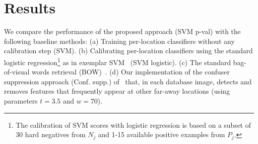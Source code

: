 





   \section{Results}
      We compare the performance of the proposed approach (SVM p-val) with the following baseline methods: (a) Training per-location classifiers without any calibration step (SVM). (b) Calibrating per-location classifiers using the standard logistic regression\footnote
         {
         The calibration of SVM scores with logistic regression is based on a subset of 30 hard negatives from $N_j$ and 1-15 available positive examples from $P_j$.
         } 
      as in exemplar SVM~\cite{Malisiewicz11} (SVM logistic). (c) The standard bag-of-visual words retrieval (BOW)~\cite{Philbin07}. (d) Our implementation of the confuser suppression  approach (Conf. supp.) of~\cite{Knopp2010} that, in each database image, detects and removes features that frequently appear at other far-away locations (using parameters $t=3.5$ and $w=70$).

